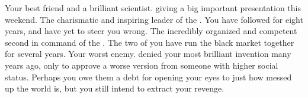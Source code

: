 \documentclass[char]{GL2020}
\begin{document}
\begin{itemz}[Notes]
	\item
\end{itemz}

\begin{contacts}
	\contact{\cHeadScientist{}} Your best friend and a brilliant scientist. \cHeadScientist{\They} \cHeadScientist{\are} giving a big important presentation this weekend.
	\contact{\cChupLeader{}} The charismatic and inspiring leader of the \pGoaties{}. You have followed \cChupLeader{\them} for eight years, and \cChupLeader{\they} have yet to steer you wrong.
	\contact{\cChupSecond{}} The incredibly organized and competent second in command of the \pGoaties{}. The two of you have run the black market together for several years.
	\contact{\cAntiChup{}} Your worst enemy. \cAntiChup{\They} denied your most brilliant invention many years ago, only to approve a worse version from someone with higher social status. Perhaps you owe them a debt for opening your eyes to just how messed up the world is, but you still intend to extract your revenge.
\end{contacts}
\end{document}

